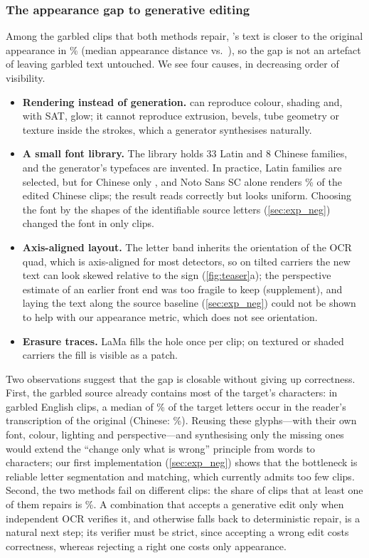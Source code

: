 \subsubsection{The appearance gap to generative editing}
\label{sec:limits}
Among the \rBothRepairN{} garbled clips that both methods repair, \steer's text is closer to the original appearance in \rSteerCloserPct\% (median appearance distance \rBothRepairMedSteer{} vs.\ \rBothRepairMedOurs), so the gap is not an artefact of \steer leaving garbled text untouched. We see four causes, in decreasing order of visibility.
\begin{itemize}
\item \textbf{Rendering instead of generation.} \method can reproduce colour, shading and, with SAT, glow; it cannot reproduce extrusion, bevels, tube geometry or texture inside the strokes, which a generator synthesises naturally.
\item \textbf{A small font library.} The library holds 33 Latin and 8 Chinese families, and the generator's typefaces are invented. In practice, \rLatinFam{} Latin families are selected, but for Chinese only \rZhFam, and Noto Sans SC alone renders \rNotoPct\% of the edited Chinese clips; the result reads correctly but looks uniform. Choosing the font by the shapes of the identifiable source letters (\cref{sec:exp_neg}) changed the font in only \rFshapeN{} clips.
\item \textbf{Axis-aligned layout.} The letter band inherits the orientation of the OCR quad, which is axis-aligned for most detectors, so on tilted carriers the new text can look skewed relative to the sign (\cref{fig:teaser}a); the perspective estimate of an earlier front end was too fragile to keep (supplement), and laying the text along the source baseline (\cref{sec:exp_neg}) could not be shown to help with our appearance metric, which does not see orientation.
\item \textbf{Erasure traces.} LaMa fills the hole once per clip; on textured or shaded carriers the fill is visible as a patch.
\end{itemize}
Two observations suggest that the gap is closable without giving up correctness. First, the garbled source already contains most of the target's characters: in garbled English clips, a median of \rCharsEn\% of the target letters occur in the reader's transcription of the original (Chinese: \rCharsZh\%). Reusing these glyphs---with their own font, colour, lighting and perspective---and synthesising only the missing ones would extend the ``change only what is wrong'' principle from words to characters; our first implementation (\cref{sec:exp_neg}) shows that the bottleneck is reliable letter segmentation and matching, which currently admits too few clips. Second, the two methods fail on different clips: the share of clips that at least one of them repairs is \rAtLeastOne\%. A combination that accepts a generative edit only when independent OCR verifies it, and otherwise falls back to deterministic repair, is a natural next step; its verifier must be strict, since accepting a wrong edit costs correctness, whereas rejecting a right one costs only appearance.

